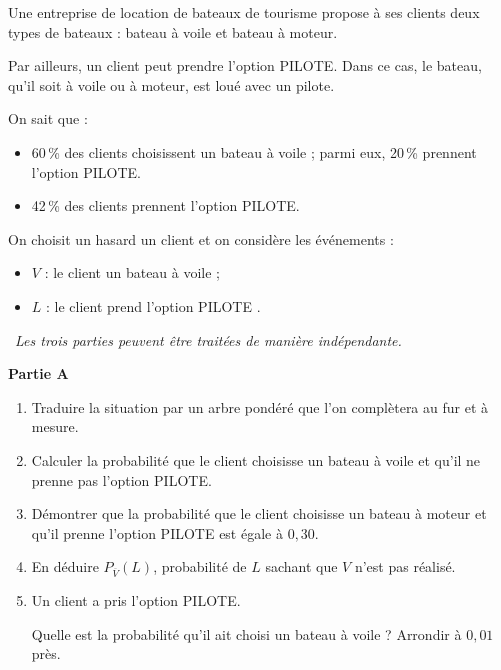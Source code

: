 Une entreprise de location de bateaux de tourisme propose à ses clients deux types de bateaux : bateau à voile et bateau à moteur.

\smallskip

Par ailleurs, un client peut prendre l'option PILOTE. Dans ce cas, le bateau, qu'il soit à voile ou à moteur, est loué avec un pilote.

\smallskip

On sait que :

\begin{itemize}
	\item 60\,\% des clients choisissent un bateau à voile ; parmi eux, 20\,\% prennent l'option PILOTE.
	\item 42\,\% des clients prennent l'option PILOTE.
\end{itemize}

On choisit un hasard un client et on considère les événements :

\begin{itemize}
	\item $V$ : \og le client un bateau à voile \fg{} ;
	\item $L$ : \og le client prend l'option PILOTE \fg.
\end{itemize}

\medskip

\hfill~\textit{Les trois parties peuvent être traitées de manière indépendante.}\hfill~

\medskip

\textbf{Partie A}

\smallskip

\begin{enumerate}
	\item Traduire la situation par un arbre pondéré que l'on complètera au fur et à mesure.
	\item Calculer la probabilité que le client choisisse un bateau à voile et qu'il ne prenne pas l'option PILOTE.
	\item Démontrer que la probabilité que le client choisisse un bateau à moteur et qu'il prenne l'option PILOTE est égale à $0,30$.
	\item En déduire $P_{\overline{V}}(L)$, probabilité de $L$ sachant que $V$ n'est pas réalisé.
	\item Un client a pris l'option PILOTE.
	
	Quelle est la probabilité qu'il ait choisi un bateau à voile ? Arrondir à $0,01$ près.
\end{enumerate}

